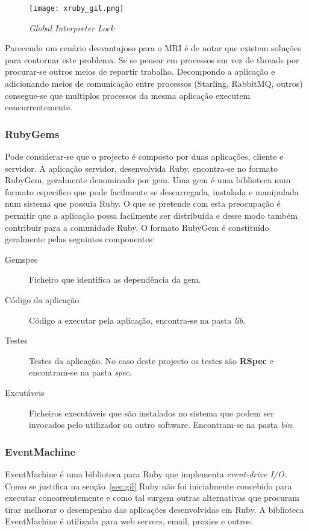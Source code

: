\begin{figure}[H]
\centering
\texttt{[image: xruby\_gil.png]}
\caption{\textit{Global Interpreter Lock}}
\label{fig:ruby-gil}
\end{figure}

Parecendo um cenário desvantajoso para o MRI é de notar que existem soluções para contornar este problema. Se se pensar em processos em vez de threads por procurar-se outros meios de repartir trabalho. Decompondo a aplicação e adicionando meios de comunicação entre processos (Starling, RabbitMQ, outros) consegue-se que multiplos processos da mesma aplicação executem concurrentemente.

\subsubsection{RubyGems}

Pode considerar-se que o projecto é composto por duas aplicações, cliente e servidor. A aplicação servidor, desenvolvida Ruby, encontra-se no formato RubyGem, geralmente denominado por gem. Uma gem é uma biblioteca num formato especifico que pode facilmente se descarregada, instalada e manipulada num sistema que possuia Ruby.\cite{rubygems} O que se pretende com esta preocupação é permitir que a aplicação possa facilmente ser distribuída e desse modo também contribuir para a comunidade Ruby. O formato RubyGem é constituído geralmente pelas seguintes componentes:

\begin{description}%
\item[Gemspec] Ficheiro que identifica as dependência da gem.
\item[Código da aplicação] Código a executar pela aplicação, encontra-se na pasta \textit{lib}.
\item[Testes] Testes da aplicação. No caso deste projecto os testes são \textbf{RSpec} e encontram-se na pasta \textit{spec}.
\item[Excutáveis] Ficheiros executáveis que são instalados no sistema que podem ser invocados pelo utilizador ou outro software. Encontram-se na pasta \textit{bin}.
\end{description}

\subsubsection{EventMachine}
EventMachine é uma biblioteca para Ruby que implementa \textit{event-drive I/O}. Como se justifica na secção~\ref{sec:gil} Ruby não foi inicialmente concebido para executar concorrentemente e como tal surgem outras alternativas que procuram tirar melhorar o desempenho das aplicações desenvolvidas em Ruby. A biblioteca EventMachine é utilizada para web servers, email, proxies e outros. 

